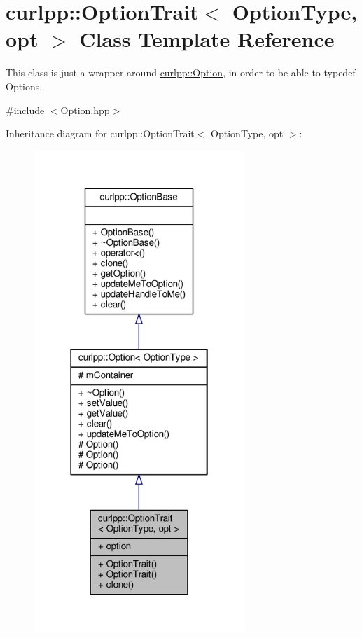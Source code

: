 \hypertarget{classcurlpp_1_1OptionTrait}{\section{curlpp\-:\-:Option\-Trait$<$ Option\-Type, opt $>$ Class Template Reference}
\label{classcurlpp_1_1OptionTrait}
}


This class is just a wrapper around \hyperlink{classcurlpp_1_1Option}{curlpp\-::\-Option}, in order to be able to typedef Options.  




{\ttfamily \#include $<$Option.\-hpp$>$}



Inheritance diagram for curlpp\-:\-:Option\-Trait$<$ Option\-Type, opt $>$\-:
\nopagebreak
\begin{figure}[H]
\begin{center}
\leavevmode
\includegraphics[width=226pt]{classcurlpp_1_1OptionTrait__inherit__graph}
\end{center}
\end{figure}


